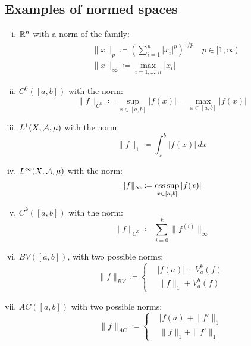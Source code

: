 \subsection{Examples of normed spaces}
\begin{enumerate}[i)]
    \item $\mathbb{R}^n$ with a norm of the family:
        \begin{align*}
            & \|x\|_p \coloneqq \left( \sum_{i=1}^n |x_i|^p \right)^{1/p} \quad p \in [1,\infty) \\
            & \|x\|_\infty \coloneqq \max_{i=1,\dots,n} |x_i|
        \end{align*}
    \item $C^0([a,b])$ with the norm:
        \begin{equation*}
            \|f\|_{C^0} \coloneqq \sup_{x \in [a,b]} |f(x)| = \max_{x \in [a,b]} |f(x)|
        \end{equation*}
    \item $L^1(X,\mathcal{A},\mu)$ with the norm:
        \begin{equation*}
            \|f\|_1 \coloneqq \int_a^b |f(x)| \, dx
        \end{equation*}
    \item $L^\infty(X,\mathcal{A},\mu)$ with the norm:
        \begin{equation*}
            \|f\|_\infty \coloneqq \operatorname*{ess\,sup}_{x \in [a,b]} |f(x)|
        \end{equation*}
    \item $C^k([a,b])$ with the norm:
        \begin{equation*}
            \|f\|_{C^k} \coloneqq \sum_{i=0}^k \|f^{(i)}\|_{\infty}
        \end{equation*}
    \item $BV([a,b])$, with two possible norms:
        \begin{equation*}
            \|f\|_{BV} \coloneqq \begin{cases}
                & |f(a)| + V_a^b(f) \\
                & \|f\|_1 + V_a^b(f)
            \end{cases}
        \end{equation*}
    \item $AC([a,b])$ with two possible norms:
        \begin{equation*}
            \|f\|_{AC} \coloneqq \begin{cases}
                & |f(a)| + \|f'\|_1 \\
                & \|f\|_1 + \|f'\|_1

\end{cases}
\end{equation*}
\end{enumerate}
